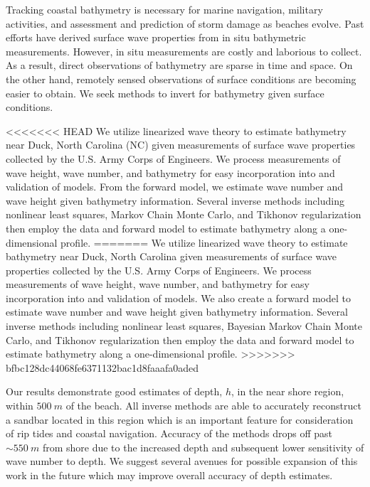 Tracking coastal bathymetry is necessary for marine navigation, military activities, and assessment and prediction of storm damage as beaches evolve. Past efforts have derived surface wave properties from in situ bathymetric measurements. However, in situ measurements are costly and laborious to collect. As a result, direct observations of bathymetry are sparse in time and space. On the other hand, remotely sensed observations of surface conditions are becoming easier to obtain. We seek methods to invert for bathymetry given surface conditions. 

<<<<<<< HEAD
We utilize linearized wave theory to estimate bathymetry near Duck, North Carolina (NC) given measurements of surface wave properties collected by the U.S. Army Corps of Engineers. We process measurements of wave height, wave number, and bathymetry for easy incorporation into and validation of models. From the forward model, we estimate wave number and wave height given bathymetry information. Several inverse methods including nonlinear least squares, Markov Chain Monte Carlo, and Tikhonov regularization then employ the data and forward model to estimate bathymetry along a one-dimensional profile.
=======
We utilize linearized wave theory to estimate bathymetry near Duck, North Carolina given measurements of surface wave properties collected by the U.S. Army Corps of Engineers. We process measurements of wave height, wave number, and bathymetry for easy incorporation into and validation of models. We also create a forward model to estimate wave number and wave height given bathymetry information. Several inverse methods including nonlinear least squares, Bayesian Markov Chain Monte Carlo, and Tikhonov regularization then employ the data and forward model to estimate bathymetry along a one-dimensional profile.
>>>>>>> bfbc128dc44068fe6371132bac1d8faaafa0aded

Our results demonstrate good estimates of depth, $h$, in the near shore region, within $500~m$ of the beach. All inverse methods are able to accurately reconstruct a sandbar located in this region which is an important feature for consideration of rip tides and coastal navigation. Accuracy of the methods drops off past $\sim550~m$ from shore due to the increased depth and subsequent lower sensitivity of wave number to depth. We suggest several avenues for possible expansion of this work in the future which may improve overall accuracy of depth estimates.